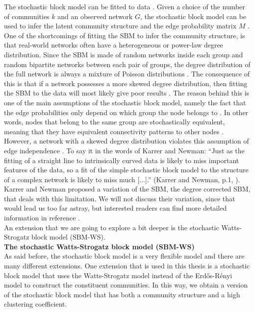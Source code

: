 \documentclass[11 pt , letterpaper , twoside , openright]{book}
\begin{document}
The stochastic block model can be fitted to data \cite{Clauset2017}. Given a choice of the number of communities $k$ and an observed network $G$, the stochastic block model can be used to infer the latent community structure and the edge probability matrix $M$ \cite{Clauset2017}. One of the shortcomings of fitting the SBM to infer the community structure, is that real-world networks often have a heterogeneous or power-law degree distribution. Since the SBM is made of random networks inside each group and random bipartite networks between each pair of groups, the degree distribution of the full network is always a mixture of Poisson distributions \cite{Clauset2017}. The consequence of this is that if a network possesses a more skewed degree distribution, then fitting the SBM to the data will most likely give poor results \cite{Karrer2011}. The reason behind this is one of the main assumptions of the stochastic block model, namely the fact that the edge probabilities only depend  on which group the node belongs to \cite{Clauset2017}. In other words, nodes that belong to the same group are stochastically  equivalent, meaning that they have equivalent connectivity patterns to other nodes \cite{Clauset2017}. However, a network with a skewed degree distribution violates this assumption of edge independence \cite{Clauset2017}. To say it in the words of Karrer and Newman: ``Just as the fitting of a straight line to intrinsically curved data is likely to miss important features of the data, so a fit of the simple stochastic block model to the structure of a complex network is likely to miss much [...].'' (Karrer and Newman, p.1, \cite{Karrer2011}). Karrer and Newman proposed a variation of the SBM, the degree corrected SBM, that deals with this limitation. We will not discuss their variation, since that would lead us too far astray, but interested readers can find more detailed information in reference \cite{Karrer2011}. \\
\newline
An extension that we are going to explore a bit deeper is the stochastic Watts-Strogatz block model (SBM-WS).\\
\newline
\textbf{The stochastic Watts-Strogatz block model (SBM-WS)}\\
\newline
As said before, the stochastic block model is a very flexible model and there are many different extensions. One extension that is used in this thesis is a stochastic block model that uses the Watts-Strogatz model instead of the Erd\H{o}s-R\'{e}nyi model to construct the constituent communities. In this way, we obtain a version of the stochastic block model that has both a community structure and a high clustering coefficient.\\
\end{document}
